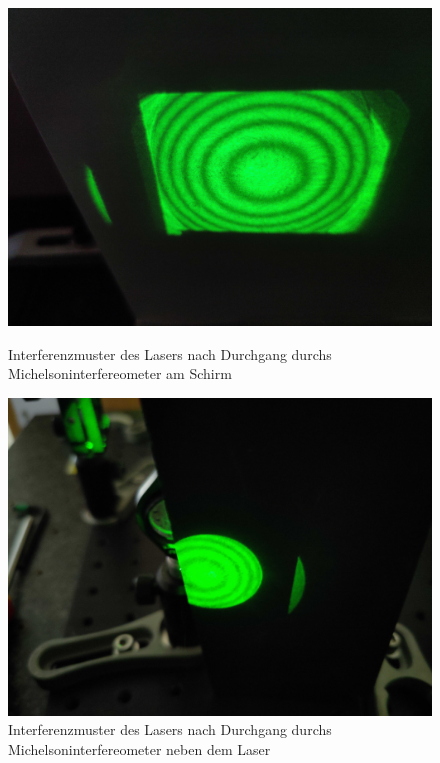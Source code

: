 \documentclass[ngerman]{scrartcl}
\begin{document}
\begin{figure}[H]
    \centering
    \begin{minipage}[t]{0.45\linewidth}
        \centering
        \includegraphics[width=\linewidth]{fig/Compressed/michelson_konz_schirm.jpg}
        \caption[Interferenzmuster Michelsoninterfereometer Schirm]{Interferenzmuster des Lasers nach Durchgang durchs Michelsoninterfereometer am Schirm}
        \label{fig:michelson_konz_sammel}
    \end{minipage}%
    \hspace*{\fill}
    \begin{minipage}[t]{0.45\linewidth}
        \centering
        \includegraphics[width=\linewidth]{fig/Compressed/michelson_konz_tuer.jpg}
        \caption[Interferenzmuster Michelsoninterfereometer Reflexion]{Interferenzmuster des Lasers nach Durchgang durchs Michelsoninterfereometer neben dem Laser}
        \label{fig:michelson_konz_sammel_tuer}
    \end{minipage}
\end{figure}
\end{document}
